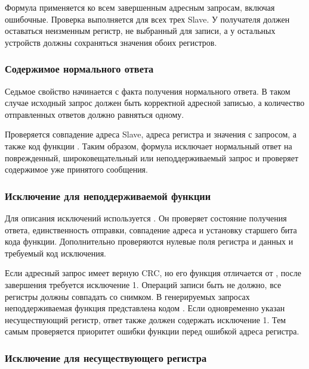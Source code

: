 Формула применяется ко всем завершенным адресным запросам, включая
ошибочные. Проверка выполняется для всех трех Slave. У получателя должен
оставаться неизменным регистр, не выбранный для записи, а у остальных
устройств должны сохраняться значения обоих регистров.

\subsubsection{Содержимое нормального ответа}

Седьмое свойство начинается с факта получения нормального ответа.
В таком случае исходный запрос должен быть корректной адресной записью,
а количество отправленных ответов должно равняться одному.


Проверяется совпадение адреса Slave, адреса регистра и значения с запросом,
а также код функции . Таким образом, формула исключает
нормальный ответ на поврежденный, широковещательный или неподдерживаемый
запрос и проверяет содержимое уже принятого сообщения.

\subsubsection{Исключение для неподдерживаемой функции}

Для описания исключений используется .
Он проверяет состояние получения ответа, единственность отправки,
совпадение адреса и установку старшего бита кода функции. Дополнительно
проверяются нулевые поля регистра и данных и требуемый код исключения.


Если адресный запрос имеет верную CRC, но его функция отличается от
, после завершения требуется исключение 1. Операций записи
быть не должно, все регистры должны совпадать со снимком. В генерируемых
запросах неподдерживаемая функция представлена кодом .
Если одновременно указан несуществующий регистр, ответ также должен
содержать исключение 1. Тем самым проверяется приоритет ошибки функции
перед ошибкой адреса регистра.

\subsubsection{Исключение для несуществующего регистра}

